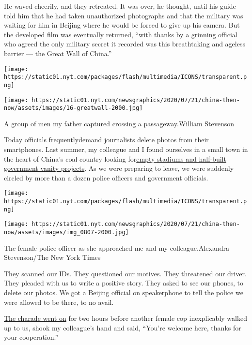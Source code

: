 He waved cheerily, and they retreated. It was over, he thought, until
his guide told him that he had taken unauthorized photographs and that
the military was waiting for him in Beijing where he would be forced to
give up his camera. But the developed film was eventually returned,
``with thanks by a grinning official who agreed the only military secret
it recorded was this breathtaking and ageless barrier --- the Great Wall
of China.''

\texttt{[image: https://static01.nyt.com/packages/flash/multimedia/ICONS/transparent.png]}

\texttt{[image: https://static01.nyt.com/newsgraphics/2020/07/21/china-then-now/assets/images/16-greatwall-2000.jpg]}

A group of men my father captured crossing a passageway.William
Stevenson

Today officials
frequently\href{https://www.nytimes.com/2019/02/27/technology/personaltech/digital-footprint-surveillance.html}{}\href{https://www.nytimes.com/2019/02/27/technology/personaltech/digital-footprint-surveillance.html}{demand
journalists delete photos} from their smartphones. Last summer, my
colleague and I found ourselves in a small town in the heart of China's
coal country looking
for\href{https://www.nytimes.com/2019/11/10/business/china-debt-hospitals.html}{}\href{https://www.nytimes.com/2019/11/10/business/china-debt-hospitals.html}{empty
stadiums and half-built government vanity projects}. As we were
preparing to leave, we were suddenly circled by more than a dozen police
officers and government officials.

\texttt{[image: https://static01.nyt.com/packages/flash/multimedia/ICONS/transparent.png]}

\texttt{[image: https://static01.nyt.com/newsgraphics/2020/07/21/china-then-now/assets/images/img\_0807-2000.jpg]}

The female police officer as she approached me and my
colleague.Alexandra Stevenson/The New York Times

They scanned our IDs. They questioned our motives. They threatened our
driver. They pleaded with us to write a positive story. They asked to
see our phones, to delete our photos. We got a Beijing official on
speakerphone to tell the police we were allowed to be there, to no
avail.

\href{https://www.nytimes.com/2019/11/10/business/china-reporter-police.html}{The
charade went on} for two hours before another female cop inexplicably
walked up to us, shook my colleague's hand and said, ``You're welcome
here, thanks for your cooperation.''

